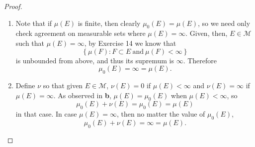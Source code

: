\documentclass{article}
\theoremstyle{definition}
\begin{document}
\begin{proof}
\begin{enumerate}[label=\textbf{\alph*.}]
		      Given any $E \in \mathscr{M}$ such that $\mu_0(E) = \infty$, by definition we see that \begin{equation*}
			      \infty = \sup \left\lbrace \mu(F) : F \subset E\ \mathrm{and}\ \mu(E) < \infty \right\rbrace,
		      \end{equation*}
		      so certainly there exists measurable $F \subset E$ such that $0 < \mu(F) < \infty$.
		      Thus $\mu_0$ is semifinite.
		\item Note that if $\mu(E)$ is finite, then clearly $\mu_0(E) = \mu(E)$, so we need only check agreement on measurable sets where $\mu(E) = \infty$.
		      Given, then, $E \in \mathscr{M}$ such that $\mu(E) = \infty$, by Exercise 14 we know that \begin{equation*}
			      \left\lbrace \mu(F) : F \subset E\ \mathrm{and}\ \mu(F) < \infty \right\rbrace
		      \end{equation*} is unbounded from above, and thus its supremum is $\infty$.
		      Therefore \begin{equation*}
			      \mu_0(E) = \infty = \mu(E).
		      \end{equation*}
		\item Define $\nu$ so that given $E \in \mathscr{M}$, $\nu(E) = 0$ if $\mu(E) < \infty$ and $\nu(E) = \infty$ if $\mu(E) = \infty$.
		      As observed in \textbf{b}, $\mu(E) = \mu_0(E)$ when $\mu(E) < \infty$, so \begin{equation*}
			      \mu_0(E) + \nu(E) = \mu_0(E) = \mu(E)
		      \end{equation*} in that case.
		      In case $\mu(E) = \infty$, then no matter the value of $\mu_0(E)$, \begin{equation*}
			      \mu_0(E) + \nu(E) = \infty = \mu(E).
		      \end{equation*}
	\end{enumerate}
\end{proof}
\end{document}
